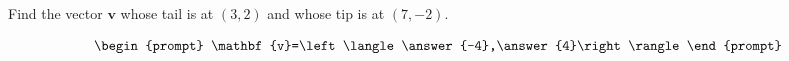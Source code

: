 \documentclass{ximera}
\author{Gregory Hartman \and Matthew Carr}
\begin{document}
\begin{exercise}




Find the vector $\mathbf{v}$ whose tail is at $(3,2)$ and whose tip is at $(7,-2)$.

\[
\begin{prompt}
\mathbf{v}=\left\langle\answer{-4},\answer{4}\right\rangle
\end{prompt}
\]

\end{exercise}
\end{document}

